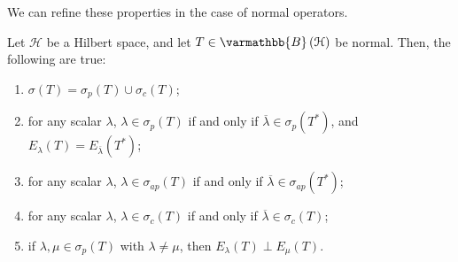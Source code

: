 \documentclass[10pt]{mypackage}
\renewcommand*{\mathbb}[1]{\varmathbb{#1}}
\newcommand{\B}{\mathbb{B}}
\begin{document}
We can refine these properties in the case of normal operators.
\begin{proposition}
  Let $\mathcal{H}$ be a Hilbert space, and let $T\in \B\left(\mathcal{H}\right)$ be normal. Then, the following are true:
  \begin{enumerate}[(1)]
    \item $\sigma\left(T\right) = \sigma_p\left(T\right) \cup \sigma_c\left(T\right)$;
    \item for any scalar $\lambda$, $\lambda\in \sigma_p\left(T\right)$ if and only if $\overline{\lambda}\in \sigma_p\left(T^{\ast}\right)$, and $E_{\lambda}\left(T\right) = E_{\overline{\lambda}}\left(T^{\ast}\right)$;
    \item for any scalar $\lambda$, $\lambda\in \sigma_{ap}\left(T\right)$ if and only if $\overline{\lambda}\in \sigma_{ap}\left(T^{\ast}\right)$;
    \item for any scalar $\lambda$, $\lambda\in \sigma_c\left(T\right)$ if and only if $\overline{\lambda}\in \sigma_c\left(T\right)$;
    \item if $\lambda,\mu\in \sigma_p\left(T\right)$ with $\lambda \neq \mu$, then $E_{\lambda}\left(T\right)\perp E_{\mu}\left(T\right)$.
  \end{enumerate}
\end{proposition}
\end{document}
